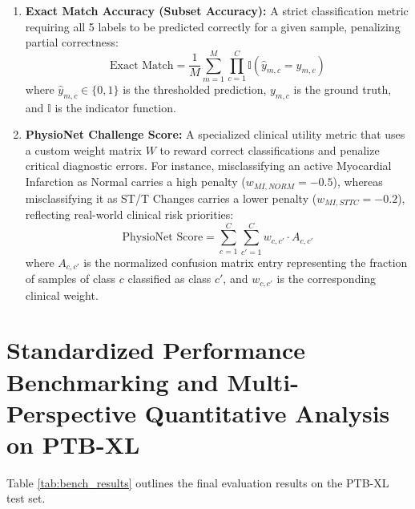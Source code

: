 \documentclass[12pt,a4paper]{report}
\begin{document}
\begin{enumerate}
    \begin{equation}
        \text{Macro AUPRC} = \frac{1}{C} \sum_{c=1}^{C} \int_{0}^{1} \text{Precision}_c(\text{Recall}_c^{-1}(v)) \, dv
    \end{equation}
    \item \textbf{Exact Match Accuracy (Subset Accuracy):} A strict classification metric requiring all 5 labels to be predicted correctly for a given sample, penalizing partial correctness:
    \begin{equation}
        \text{Exact Match} = \frac{1}{M} \sum_{m=1}^{M} \prod_{c=1}^{C} \mathbb{I}(\hat{y}_{m,c} = y_{m,c})
    \end{equation}
    where $\hat{y}_{m,c} \in \{0, 1\}$ is the thresholded prediction, $y_{m,c}$ is the ground truth, and $\mathbb{I}$ is the indicator function.
    \item \textbf{PhysioNet Challenge Score:} A specialized clinical utility metric that uses a custom weight matrix $W$ to reward correct classifications and penalize critical diagnostic errors. For instance, misclassifying an active Myocardial Infarction as Normal carries a high penalty ($w_{MI, NORM} = -0.5$), whereas misclassifying it as ST/T Changes carries a lower penalty ($w_{MI, STTC} = -0.2$), reflecting real-world clinical risk priorities:
    \begin{equation}
        \text{PhysioNet Score} = \sum_{c=1}^{C} \sum_{c'=1}^{C} w_{c,c'} \cdot A_{c,c'}
    \end{equation}
    where $A_{c,c'}$ is the normalized confusion matrix entry representing the fraction of samples of class $c$ classified as class $c'$, and $w_{c,c'}$ is the corresponding clinical weight.
\end{enumerate}

\section{Standardized Performance Benchmarking and Multi-Perspective Quantitative Analysis on PTB-XL}
Table \ref{tab:bench_results} outlines the final evaluation results on the PTB-XL test set.
\end{document}
